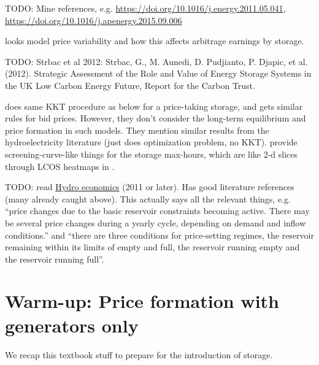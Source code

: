 \documentclass[final,3p]{elsarticle}
\begin{document}
TODO: Mine \cite{Ward2018} references, e.g.
\url{https://doi.org/10.1016/j.energy.2011.05.041},
\url{https://doi.org/10.1016/j.apenergy.2015.09.006}

\cite{Ward2019} looks model price variability and how this affects arbitrage
earnings by storage.

TODO: Strbac et al 2012: Strbac, G., M. Aunedi, D. Pudjianto, P. Djapic, et al.
(2012). Strategic Assessment of the Role and Value of Energy Storage Systems in
the UK Low Carbon Energy Future, Report for the Carbon Trust.

\cite{CRAMPES2019100746} does same KKT procedure as below for a price-taking
storage, and gets similar rules for bid prices. However, they don't consider the
long-term equilibrium and price formation in such models. They mention similar
results from the hydroelectricity literature \cite{lederer1984overall} (just
does optimization problem, no KKT). \cite{CRAMPES2019100746} provide
screening-curve-like things for the storage max-hours, which are like 2-d slices
through LCOS heatmaps in \cite{schmidtmelchior2019}.

TODO: read
\href{https://www.uio.no/studier/emner/sv/oekonomi/ECON4930/v11/undervisningsmateriale/Hydropower%20economics4.pdf}{Hydro
  economics} (2011 or later). Has good literature references (many already
caught above). This actually says all the relevant things, e.g. ``price changes
due to the basic reservoir constraints becoming active.  There may be several
price changes during a yearly cycle, depending on demand and inflow
conditions.'' and ``there are three conditions for price-setting regimes, the
reservoir remaining within its limits of empty and full, the reservoir running
empty and the reservoir running full''.

\section{Warm-up: Price formation with generators only}\label{sec:generators}

We recap this textbook stuff to prepare for the introduction of storage.
\end{document}
